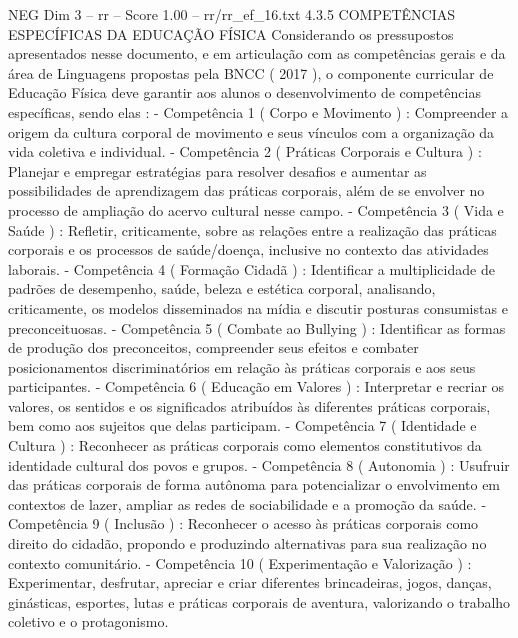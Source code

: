 \begin{textsample}{NEG Dim 3 – rr – Score 1.00 – rr/rr\_ef\_16.txt}  \label{ex:f3_neg_062}
4.3.5 COMPETÊNCIAS ESPECÍFICAS DA EDUCAÇÃO FÍSICA Considerando os pressupostos apresentados nesse documento, e em articulação com as competências gerais e da área de Linguagens propostas pela BNCC ( 2017 ), o componente curricular de Educação Física deve garantir aos alunos o desenvolvimento de competências específicas, sendo elas : - Competência 1 ( Corpo e Movimento ) : Compreender a origem da cultura corporal de movimento e seus vínculos com a organização da vida coletiva e individual. - Competência 2 ( Práticas Corporais e Cultura ) : Planejar e empregar estratégias para resolver desafios e aumentar as possibilidades de aprendizagem das práticas corporais, além de se envolver no processo de ampliação do acervo cultural nesse campo. - Competência 3 ( Vida e Saúde ) : Refletir, criticamente, sobre as relações entre a realização das práticas corporais e os processos de saúde/doença, inclusive no contexto das atividades laborais. - Competência 4 ( Formação Cidadã ) : Identificar a multiplicidade de padrões de desempenho, saúde, beleza e estética corporal, analisando, criticamente, os modelos disseminados na mídia e discutir posturas consumistas e preconceituosas. - Competência 5 ( Combate ao Bullying ) : Identificar as formas de produção dos preconceitos, compreender seus efeitos e combater posicionamentos discriminatórios em relação às práticas corporais e aos seus participantes. - Competência 6 ( Educação em Valores ) : Interpretar e recriar os valores, os sentidos e os significados atribuídos às diferentes práticas corporais, bem como aos sujeitos que delas participam. - Competência 7 ( Identidade e Cultura ) : Reconhecer as práticas corporais como elementos constitutivos da identidade cultural dos povos e grupos. - Competência 8 ( Autonomia ) : Usufruir das práticas corporais de forma autônoma para potencializar o envolvimento em contextos de lazer, ampliar as redes de sociabilidade e a promoção da saúde. - Competência 9 ( Inclusão ) : Reconhecer o acesso às práticas corporais como direito do cidadão, propondo e produzindo alternativas para sua realização no contexto comunitário. - Competência 10 ( Experimentação e Valorização ) : Experimentar, desfrutar, apreciar e criar diferentes brincadeiras, jogos, danças, ginásticas, esportes, lutas e práticas corporais de aventura, valorizando o trabalho coletivo e o protagonismo.

\end{textsample}

